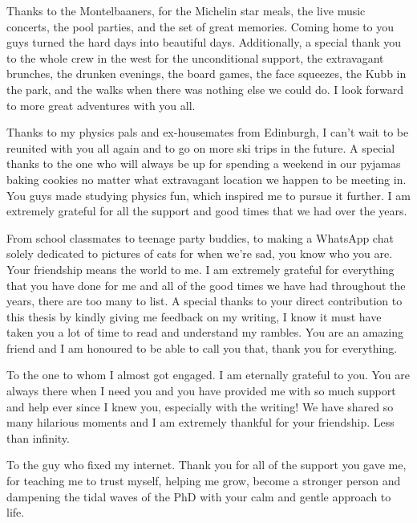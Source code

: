 Thanks to the Montelbaaners, for the Michelin star meals, the live music concerts, the pool parties, and the set of great memories. Coming home to you guys turned the hard days into beautiful days. Additionally, a special thank you to the whole crew in the west for the unconditional support, the extravagant brunches, the drunken evenings, the board games, the face squeezes, the Kubb in the park, and the walks when there was nothing else we could do. I look forward to more great adventures with you all.

Thanks to my physics pals and ex-housemates from Edinburgh, I can’t wait to be reunited with you all again and to go on more ski trips in the future. A special thanks to the one who will always be up for spending a weekend in our pyjamas baking cookies no matter what extravagant location we happen to be meeting in. You guys made studying physics fun, which inspired me to pursue it further. I am extremely grateful for all the support and good times that we had over the years.

From school classmates to teenage party buddies, to making a WhatsApp chat solely dedicated to pictures of cats for when we’re sad, you know who you are. Your friendship means the world to me. I am extremely grateful for everything that you have done for me and all of the good times we have had throughout the years, there are too many to list. A special thanks to your direct contribution to this thesis by kindly giving me feedback on my writing, I know it must have taken you a lot of time to read and understand my rambles. You are an amazing friend and I am honoured to be able to call you that, thank you for everything.

To the one to whom I almost got engaged. I am eternally grateful to you. You are always there when I need you and you have provided me with so much support and help ever since I knew you, especially with the writing! We have shared so many hilarious moments and I am extremely thankful for your friendship. Less than infinity.

To the guy who fixed my internet. Thank you for all of the support you gave me, for teaching me to trust myself, helping me grow, become a stronger person and dampening the tidal waves of the PhD with your calm and gentle approach to life.

